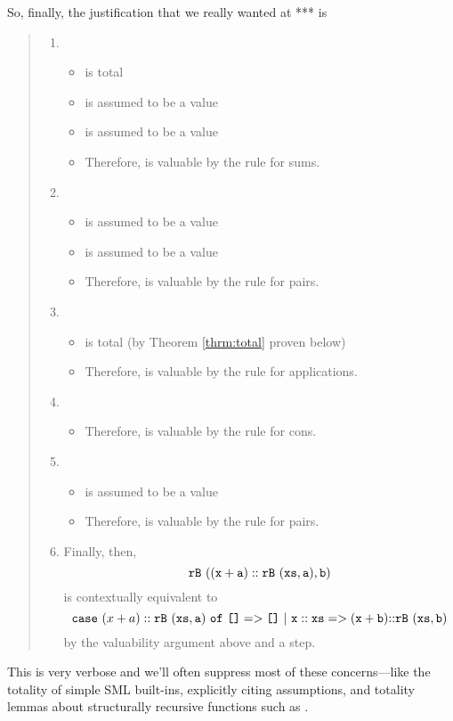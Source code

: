 \documentclass[11pt]{article}
\begin{document}
So, finally, the justification that we really wanted at *** is
\begin{quote}
  \begin{enumerate}
    \item
    \begin{itemize}
    \item \sml{+} is total
    \item {} is assumed to be a value
    \item {} is assumed to be a value
    \item Therefore,  is valuable by the rule for sums.
    \end{itemize}

    \item
    \begin{itemize}
    \item {} is assumed to be a value
    \item {} is assumed to be a value
    \item Therefore,  is valuable by the rule for pairs.
    \end{itemize}

    \item
    \begin{itemize}
    \item \sml{\rb} is total (by Theorem \ref{thrm:total} proven below)
    \item Therefore,  is valuable by the rule for
    applications.
    \end{itemize}

    \item
    \begin{itemize}
    \item Therefore,  is valuable by the rule for
      cons.
    \end{itemize}

    \item
    \begin{itemize}
    \item {} is assumed to be a value
    \item Therefore,  is valuable by the rule
      for pairs.
    \end{itemize}

    \item Finally, then, $${\mathtt{rB}}~{\mathtt{((x+a)::{\mathtt{rB}}~{\mathtt{(xs,a)}},b)}}$$ is
      contextually equivalent to $$\mathtt{case}~{(x+a) ::{\mathtt{rB}}~{\mathtt{(xs,a)}}}~\mathtt{of}~{\texttt{[]}} => {\texttt{[]}}~|~{\mathtt{x::xs}} => {\mathtt{(x+{b})}\mathtt{::}{\mathtt{rB}}~{\mathtt{(xs,{b})}}}$$
      by the valuability argument above and a step.
  \end{enumerate}
\end{quote}
This is very verbose and we'll often suppress most of these concerns---like
the totality of simple SML built-ins, explicitly citing assumptions, and
totality lemmas about structurally recursive functions such as
\sml{\rb}.
\end{document}
